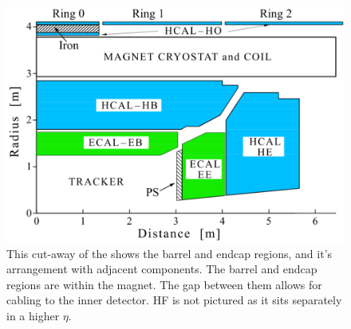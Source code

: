 \begin{figure}[!tp]
    \centering
    \includegraphics[width=\textwidth]{figures/HCAL.png}
    \caption[
       \CMS \HCAL diagram.
    ]{
        This cut-away of the \HCAL shows the barrel and endcap regions, and it's arrangement with adjacent \CMS components.  The barrel and endcap regions are within the magnet. The gap between them allows for cabling to the inner detector. HF is not pictured as it sits separately in a higher \ensuremath{\eta}. \cite{HCALperf}
    }
    \label{fig:hcal}
\end{figure}


